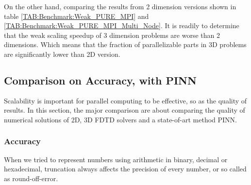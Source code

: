 On the other hand, comparing the results from 2 dimension versions shown in table \ref{TAB:Benchmark:Weak_PURE_MPI} and \ref{TAB:Benchmark:Weak_PURE_MPI_Multi_Node}.
It is readily to determine that the weak scaling speedup of 3 dimension problems are worse than 2 dimensions.
Which means that the fraction of parallelizable parts in 3D problems are significantly lower than 2D version.

















\subsection{Comparison on Accuracy, with PINN}
Scalability is important for parallel computing to be effective, so as the quality of results.
In this section, the major comparison are about comparing the quality of numerical solutions of 
2D, 3D FDTD solvers and a state-of-art method PINN.


\subsubsection{Accuracy}
When we tried to represent numbers using arithmetic in binary, decimal or hexadecimal, truncation always affects the precision of every number, 
or so called as 
round-off-error.

